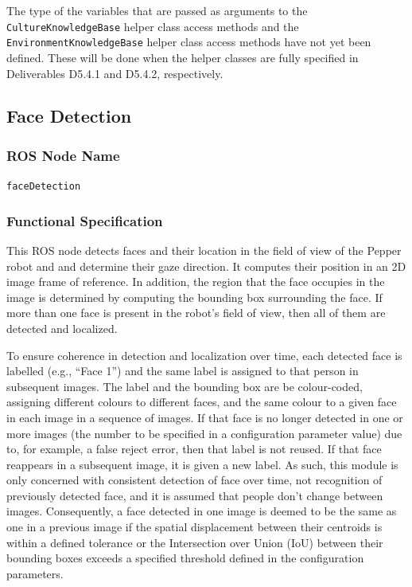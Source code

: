 \documentclass{CSSRforAfrica}
\begin{document}
The type of the variables that are passed as  arguments to the 
{\small \verb+CultureKnowledgeBase+} helper class access methods and the 
{\small \verb+EnvironmentKnowledgeBase+} helper class access methods 
have not yet been defined. 
These will be done when the helper classes are fully specified in Deliverables D5.4.1 and D5.4.2, respectively.


\newpage

\subsection{Face Detection }

\subsubsection*{ROS Node Name}
 {\small \verb+faceDetection+}   

\subsubsection*{Functional Specification}
This ROS node detects faces and their location  in the field of view of the Pepper robot and  and determine their gaze direction. It computes their position in an 2D image frame of reference. In addition, the region that the face occupies in the image is determined by computing the bounding box surrounding the face. If more than one face is present in the robot’s field of view, then all of them are detected and localized.  

To ensure coherence in detection and localization over time, each detected face is labelled (e.g., ``Face 1'') and the same label is assigned to that person in subsequent images.  The label and the bounding box are be colour-coded, assigning different colours to different faces, and the same colour to a given face in each image in a sequence of images.   If that face is no longer detected in one or more images  (the number to be specified in a configuration parameter value) due to, for example, a false reject error, then that label is not reused. If that face reappears in a subsequent image, it is given a new label. As such, this module is only concerned with consistent detection of face over time, not recognition of previously detected face, and it is assumed that people don't change between images.  Consequently, a face detected in one image is deemed to be the same as one in a previous image if the spatial displacement between their centroids is within a defined tolerance or the Intersection over Union (IoU) between their bounding boxes exceeds a specified threshold defined in the configuration parameters.
\end{document}

